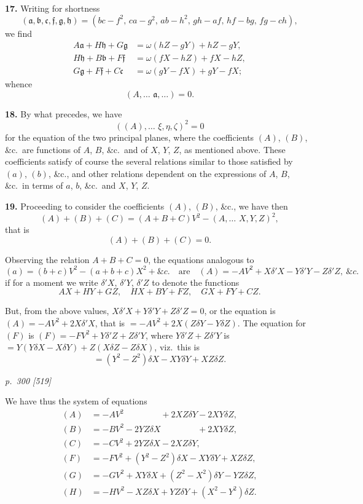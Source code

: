 \documentclass[11pt,a4paper]{article}
\theoremstyle{plain}
\begin{document}
\textbf{17.} Writing for shortness
\[
(\mathfrak{a}, \mathfrak{b}, \mathfrak{c}, \mathfrak{f}, \mathfrak{g}, \mathfrak{h}) = (bc - f^2,\, ca - g^2,\, ab - h^2,\, gh - af,\, hf - bg,\, fg - ch),
\]
we find
\begin{align*}
A\mathfrak{a} + H\mathfrak{h} + G\mathfrak{g} &= \omega(hZ - gY) + hZ - gY, \\
H\mathfrak{h} + B\mathfrak{b} + F\mathfrak{f} &= \omega(fX - hZ) + fX - hZ, \\
G\mathfrak{g} + F\mathfrak{f} + C\mathfrak{c} &= \omega(gY - fX) + gY - fX;
\end{align*}
whence
\[
(A, \ldots\,\,\mathfrak{a}, \ldots) = 0.
\]

\textbf{18.} By what precedes, we have
\[
((A), \ldots\,\,\xi, \eta, \zeta)^2 = 0
\]
for the equation of the two principal planes, where the coefficients $(A)$, $(B)$, \&c.\ are
functions of $A$, $B$, \&c.\ and of $X$, $Y$, $Z$, as mentioned above.  These coefficients satisfy
of course the several relations similar to those satisfied by $(a)$, $(b)$, \&c., and other
relations dependent on the expressions of $A$, $B$, \&c.\ in terms of $a$, $b$, \&c.\ and $X$, $Y$, $Z$.

\textbf{19.} Proceeding to consider the coefficients $(A)$, $(B)$, \&c., we have then
\[
(A) + (B) + (C) = (A + B + C)V^2 - (A, \ldots\,\,X, Y, Z)^2,
\]
that is
\[
(A) + (B) + (C) = 0.
\]

Observing the relation $A + B + C = 0$, the equations analogous to
\[
(a) = (b + c)V^2 - (a + b + c)X^2 + \&c.\quad \text{are}\quad (A) = -AV^2 + X\delta'X - Y\delta'Y - Z\delta'Z,\ \&c.
\]
if for a moment we write $\delta'X$, $\delta'Y$, $\delta'Z$ to denote the functions
\[
AX + HY + GZ,\quad HX + BY + FZ,\quad GX + FY + CZ.
\]

But, from the above values, $X\delta'X + Y\delta'Y + Z\delta'Z = 0$, or the equation is $(A) = -AV^2 + 2X\delta'X$,
that is $= -AV^2 + 2X(Z\delta Y - Y\delta Z)$.  The equation for $(F)$ is $(F) = -FV^2 + Y\delta'Z + Z\delta'Y$,
where $Y\delta'Z + Z\delta'Y$ is $= Y(Y\delta X - X\delta Y) + Z(X\delta Z - Z\delta X)$, viz.\ this is
\[
= (Y^2 - Z^2)\delta X - XY\delta Y + XZ\delta Z.
\]

\bigskip
\textit{p.~300 [519]}
\smallskip

We have thus the system of equations
\begin{align*}
(A) &= -AV^2 \phantom{{}+ 2YZ\delta X} + 2XZ\delta Y - 2XY\delta Z, \\
(B) &= -BV^2 - 2YZ\delta X \phantom{{}+ 2XZ\delta Y} + 2XY\delta Z, \\
(C) &= -CV^2 + 2YZ\delta X - 2XZ\delta Y, \\
(F) &= -FV^2 + (Y^2 - Z^2)\delta X - XY\delta Y + XZ\delta Z, \\
(G) &= -GV^2 + XY\delta X + (Z^2 - X^2)\delta Y - YZ\delta Z, \\
(H) &= -HV^2 - XZ\delta X + YZ\delta Y + (X^2 - Y^2)\delta Z.
\end{align*}
\end{document}
